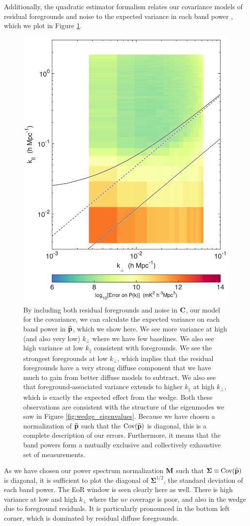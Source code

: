 Additionally, the quadratic estimator formalism relates our covariance models of residual foregrounds and noise to the expected variance in each band power \citep{LT11,DillonFast,X13}, which we plot in Figure \ref{fig:2dError}.
\begin{figure}[] 
	\centering 
	\includegraphics[width=.48\textwidth]{chap4_empirical_covariance/2dError.png}
	\caption[Expected variance on each band power.]{By including both residual foregrounds and noise in $\mathbf{C}$, our model for the covariance, we can calculate the expected variance on each band power in $\widehat{\mathbf{p}}$, which we show here. We see more variance at high (and also very low) $k_\perp$ where we have few baselines. We also see high variance at low $k_\|$ consistent with foregrounds. We see the strongest foregrounds at low $k_\perp$, which implies that the residual foregrounds have a very strong diffuse component that we have much to gain from better diffuse models to subtract. We also see that foreground-associated variance extends to higher $k_\|$ at high $k_\perp$, which is exactly the expected effect from the wedge. Both these observations are consistent with the structure of the eigenmodes we saw in Figure \ref{fig:wedge_eigenvalues}. Because we have chosen a normalization of $\widehat{\mathbf{p}}$ such that the $\text{Cov}(\widehat{\mathbf{p}})$ is diagonal, this is a complete description of our errors. Furthermore, it means that the band powers form a mutually exclusive and collectively exhaustive set of measurements.}
	\label{fig:2dError}
\end{figure}
As we have chosen our power spectrum normalization $\mathbf{M}$ such that $\boldsymbol\Sigma \equiv \text{Cov}(\widehat{\mathbf{p}})$ is diagonal, it is sufficient to plot the diagonal of $\boldsymbol\Sigma^{1/2}$, the standard deviation of each band power. The EoR window is seen clearly here as well. There is high variance at low and high $k_\perp$ where the $uv$ coverage is poor, and also in the wedge due to foreground residuals. It is particularly pronounced in the bottom left corner, which is dominated by residual diffuse foregrounds.

